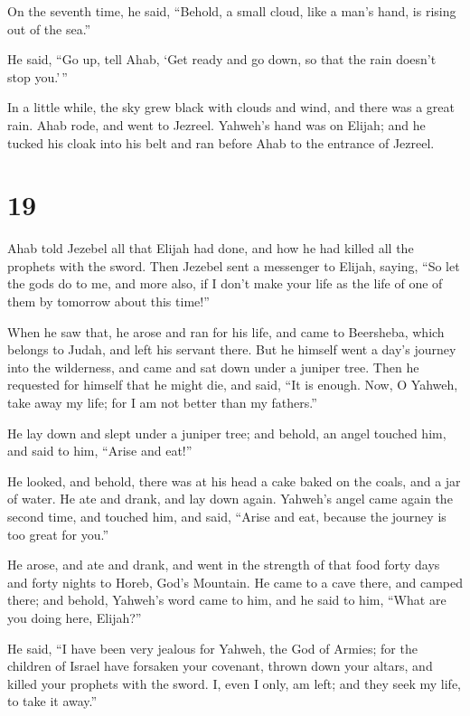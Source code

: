  On the seventh time, he said, ``Behold, a small cloud,
like a man's hand, is rising out of the sea.''

He said, ``Go up, tell Ahab, `Get ready and go down, so that the rain
doesn't stop you.'\,''

 In a little while, the sky grew black with clouds and
wind, and there was a great rain. Ahab rode, and went to Jezreel.
 Yahweh's hand was on Elijah; and he tucked his cloak into
his belt and ran before Ahab to the entrance of Jezreel.

\hypertarget{section-18}{%
\section{19}\label{section-18}}

 Ahab told Jezebel all that Elijah had done, and how he had
killed all the prophets with the sword.  Then Jezebel sent a
messenger to Elijah, saying, ``So let the gods do to me, and more also,
if I don't make your life as the life of one of them by tomorrow about
this time!''

 When he saw that, he arose and ran for his life, and came
to Beersheba, which belongs to Judah, and left his servant there.
 But he himself went a day's journey into the wilderness,
and came and sat down under a juniper tree. Then he requested for
himself that he might die, and said, ``It is enough. Now, O Yahweh, take
away my life; for I am not better than my fathers.''

 He lay down and slept under a juniper tree; and behold, an
angel touched him, and said to him, ``Arise and eat!''

 He looked, and behold, there was at his head a cake baked
on the coals, and a jar of water. He ate and drank, and lay down again.
 Yahweh's angel came again the second time, and touched him,
and said, ``Arise and eat, because the journey is too great for you.''

 He arose, and ate and drank, and went in the strength of
that food forty days and forty nights to Horeb, God's Mountain.
 He came to a cave there, and camped there; and behold,
Yahweh's word came to him, and he said to him, ``What are you doing
here, Elijah?''

 He said, ``I have been very jealous for Yahweh, the God of
Armies; for the children of Israel have forsaken your covenant, thrown
down your altars, and killed your prophets with the sword. I, even I
only, am left; and they seek my life, to take it away.''

